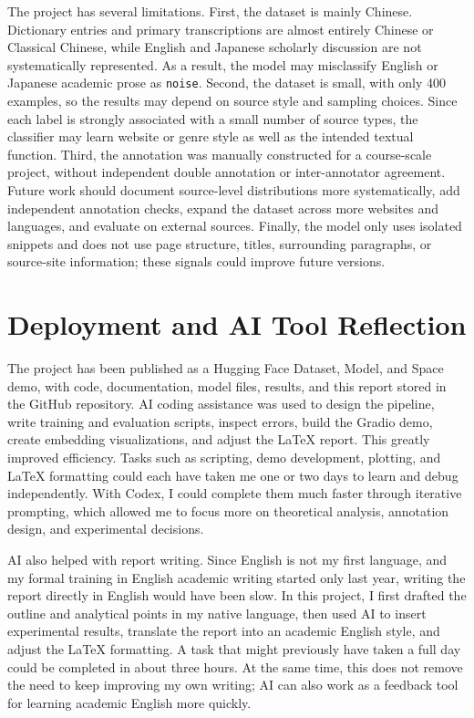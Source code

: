 \documentclass[11pt,a4paper]{article}
\begin{document}
The project has several limitations. First, the dataset is mainly Chinese. Dictionary entries and primary transcriptions are almost entirely Chinese or Classical Chinese, while English and Japanese scholarly discussion are not systematically represented. As a result, the model may misclassify English or Japanese academic prose as \texttt{noise}. Second, the dataset is small, with only 400 examples, so the results may depend on source style and sampling choices. Since each label is strongly associated with a small number of source types, the classifier may learn website or genre style as well as the intended textual function. Third, the annotation was manually constructed for a course-scale project, without independent double annotation or inter-annotator agreement. Future work should document source-level distributions more systematically, add independent annotation checks, expand the dataset across more websites and languages, and evaluate on external sources. Finally, the model only uses isolated snippets and does not use page structure, titles, surrounding paragraphs, or source-site information; these signals could improve future versions.

\section{Deployment and AI Tool Reflection}

The project has been published as a Hugging Face Dataset, Model, and Space demo, with code, documentation, model files, results, and this report stored in the GitHub repository. AI coding assistance was used to design the pipeline, write training and evaluation scripts, inspect errors, build the Gradio demo, create embedding visualizations, and adjust the \LaTeX{} report. This greatly improved efficiency. Tasks such as scripting, demo development, plotting, and \LaTeX{} formatting could each have taken me one or two days to learn and debug independently. With Codex, I could complete them much faster through iterative prompting, which allowed me to focus more on theoretical analysis, annotation design, and experimental decisions.

AI also helped with report writing. Since English is not my first language, and my formal training in English academic writing started only last year, writing the report directly in English would have been slow. In this project, I first drafted the outline and analytical points in my native language, then used AI to insert experimental results, translate the report into an academic English style, and adjust the \LaTeX{} formatting. A task that might previously have taken a full day could be completed in about three hours. At the same time, this does not remove the need to keep improving my own writing; AI can also work as a feedback tool for learning academic English more quickly.
\end{document}
